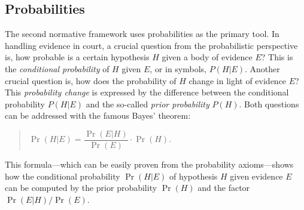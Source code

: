 \documentclass[10pt]{article}
\begin{document}
\subsection{Probabilities}
\label{sec:normfram:prob}
The second normative framework %
uses probabilities as the primary tool. 
In handling evidence in court, a crucial question from the probabilistic perspective is, 
how probable is a certain hypothesis $H$ given a body of evidence $E$? This is 
the \textit{conditional probability} of $H$ given $E$, or in symbols, $P(H|E)$. 
Another crucial question is, how does the probability of $H$ 
change in light of evidence $E$? This \textit{probability change} is expressed by 
the difference between the conditional probability $P(H|E)$ and the so-called \textit{prior 
probability} $P(H)$.
Both questions can be addressed with 
the famous Bayes' theorem:
%
\begin{quotation}
	$\Pr(H|E) = \dfrac{\Pr(E|H)}{\Pr(E)}\cdot\Pr(H)$.
\end{quotation}
%
This formula---which can be easily proven from 
the probability axioms---shows how the 
conditional probability $\Pr(H|E)$ of hypothesis $H$ given evidence $E$ 
can be computed by the prior probability $\Pr(H)$ and the 
factor $\Pr(E|H)/\Pr(E)$.  
\end{document}
